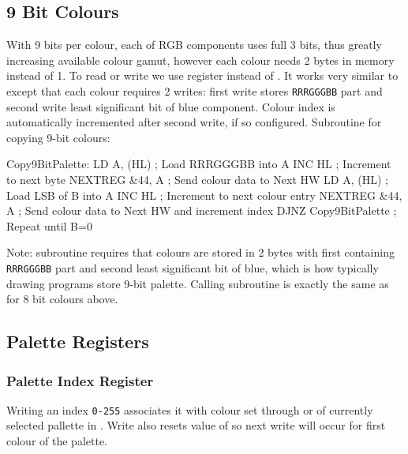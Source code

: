 \subsection{9 Bit Colours}

With 9 bits per colour, each of RGB components uses full 3 bits, thus greatly increasing available colour gamut, however each colour needs 2 bytes in memory instead of 1. To read or write we use  register instead of . It works very similar to  except that each colour requires 2 writes: first write stores {\tt RRRGGGBB} part and second write least significant bit of blue component. Colour index is automatically incremented after second write, if so configured. Subroutine for copying 9-bit colours:

\begin{tcblisting}{}
Copy9BitPalette:
	LD A, (HL)                ; Load RRRGGGBB into A
	INC HL                    ; Increment to next byte
	NEXTREG &44, A            ; Send colour data to Next HW
	LD A, (HL)                ; Load LSB of B into A
	INC HL                    ; Increment to next colour entry
	NEXTREG &44, A            ; Send colour data to Next HW and increment index
	DJNZ Copy9BitPalette      ; Repeat until B=0
\end{tcblisting}

Note: subroutine requires that colours are stored in 2 bytes with first containing {\tt RRRGGGBB} part and second least significant bit of blue, which is how typically drawing programs store 9-bit palette. Calling subroutine is exactly the same as for 8 bit colours above.


\subsection{Palette Registers}
\label{zx_next_palette_registers}

\subsubsection{Palette Index Register }

\begin{NextPort}
\end{NextPort}

Writing an index {\tt 0-255} associates it with colour set through  or  of currently selected pallette in . Write also resets value of  so next write will occur for first colour of the palette.

